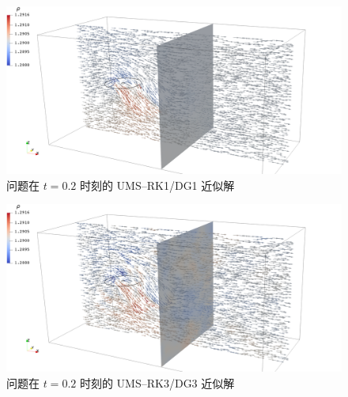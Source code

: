 \begin{figure}[h!]
\begin{centering}
\includegraphics[width=1\textwidth,height=0.26\textheight,keepaspectratio]{figures/forward/p=1/Frame20}
\par\end{centering}
\caption{\label{fig:forward_t=00003D2e-1_p=00003D1}问题在
$t=0.2$ 时刻的 UMS–RK1/DG1 近似解}
\end{figure}

\begin{figure}[h!]
\begin{centering}
\includegraphics[width=1\textwidth,height=0.26\textheight,keepaspectratio]{figures/forward/p=3/Frame20}
\par\end{centering}
\caption{\label{fig:forward_t=00003D2e-1_p=00003D3}问题在
$t=0.2$ 时刻的 UMS–RK3/DG3 近似解}
\end{figure}

